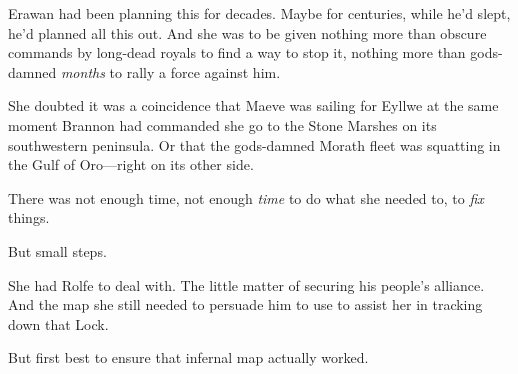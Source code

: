 Erawan had been planning this for decades. Maybe for centuries, while he'd slept, he'd planned all this out. And she was to be given nothing more than obscure commands by long-dead royals to find a way to stop it, nothing more than gods-damned \emph{months} to rally a force against him.

She doubted it was a coincidence that Maeve was sailing for Eyllwe at the same moment Brannon had commanded she go to the Stone Marshes on its southwestern peninsula. Or that the gods-damned Morath fleet was squatting in the Gulf of Oro---right on its other side.

There was not enough time, not enough \emph{time} to do what she needed to, to \emph{fix} things.

But  small steps.

She had Rolfe to deal with. The little matter of securing his people's alliance. And the map she still needed to persuade him to use to assist her in tracking down that Lock.

But first  best to ensure that infernal map actually worked.
